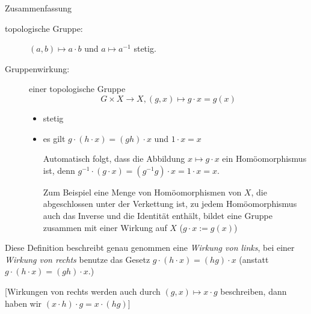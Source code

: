 \documentclass[a4paper,10pt]{scrartcl}
\begin{document}
\begin{seg}{Zusammenfassung}
 \begin{description}
  \item[topologische Gruppe:] $(a,b)\mapsto a\cdot b$ und $a\mapsto a^{-1}$ stetig.
  \item[Gruppenwirkung:] einer topologische Gruppe
\[
 G\times X\to X, (g,x) \mapsto g\cdot x=g(x) 
\]
\begin{itemize}
 \item stetig
 \item es gilt $g\cdot (h\cdot x)=(gh)\cdot x$ und $1\cdot x = x$

Automatisch folgt, dass die Abbildung $x\mapsto g\cdot x$ ein Homöomorphismus ist, denn $g^{-1} \cdot (g\cdot x)=(g^{-1}g)\cdot x=1\cdot x=x.$

Zum Beispiel eine Menge von Homöomorphismen von $X$, die abgeschlossen unter der Verkettung ist, zu jedem Homöomorphismus auch das Inverse und die Identität enthält, bildet eine Gruppe zusammen mit einer Wirkung auf $X$ ($g\cdot x:=g(x)$)
\end{itemize}
 \end{description}
\end{seg}
Diese Definition beschreibt genau genommen eine \emph{Wirkung von links}, bei einer \emph{Wirkung von rechts} benutze das Gesetz $g\cdot (h\cdot x)=(hg)\cdot x$ (anstatt $g\cdot(h\cdot x)=(gh)\cdot x$.)

[Wirkungen von rechts werden auch durch $(g,x)\mapsto x\cdot g$ beschreiben, dann haben wir $(x\cdot h)\cdot g=x\cdot (hg)$]
\end{document}

